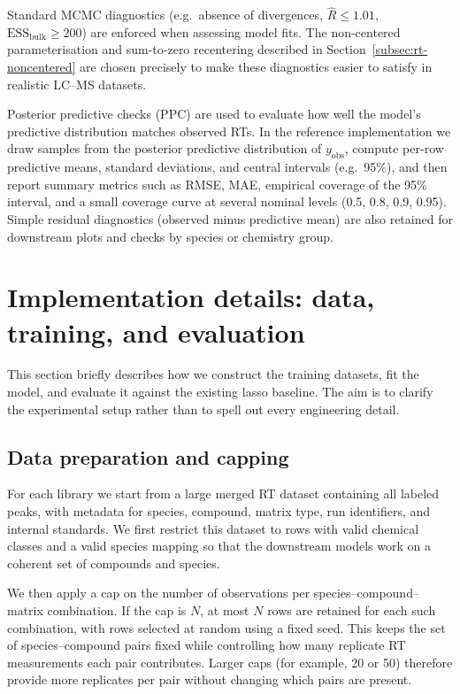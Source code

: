 \documentclass[11pt]{article}
\begin{document}
Standard MCMC diagnostics (e.g.\ absence of divergences, $\hat{R}\le 1.01$,
$\mathrm{ESS}_{\mathrm{bulk}}\ge 200$) are enforced when assessing model fits. The
non-centered parameterisation and sum-to-zero recentering described in
Section~\ref{subsec:rt-noncentered} are chosen
precisely to make these diagnostics easier to satisfy in realistic LC--MS datasets.

Posterior predictive checks (PPC) are used to evaluate how well the model's predictive
distribution matches observed RTs. In the reference implementation we draw samples
from the posterior predictive distribution of $y_{\mathrm{obs}}$, compute per-row
predictive means, standard deviations, and central intervals (e.g.\ 95\%), and then
report summary metrics such as RMSE, MAE, empirical coverage of the 95\% interval, and
a small coverage curve at several nominal levels (0.5, 0.8, 0.9, 0.95). Simple residual
diagnostics (observed minus predictive mean) are also retained for downstream plots
and checks by species or chemistry group.

\section{Implementation details: data, training, and evaluation}

This section briefly describes how we construct the training datasets, fit the model,
and evaluate it against the existing lasso baseline. The aim is to clarify the
experimental setup rather than to spell out every engineering detail.

\subsection{Data preparation and capping}

For each library we start from a large merged RT dataset containing all labeled peaks,
with metadata for species, compound, matrix type, run identifiers, and internal
standards. We first restrict this dataset to rows with valid chemical classes and a
valid species mapping so that the downstream models work on a coherent set of
compounds and species.

We then apply a cap on the number of observations per species--compound--matrix
combination. If the cap is $N$, at most $N$ rows are retained for each such
combination, with rows selected at random using a fixed seed. This keeps the set of
species--compound pairs fixed while controlling how many replicate RT measurements
each pair contributes. Larger caps (for example, 20 or 50) therefore provide more
replicates per pair without changing which pairs are present.
\end{document}
